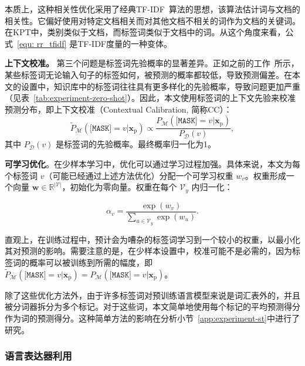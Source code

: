 本质上，这种相关性优化采用了经典TF-IDF~\cite{jones1972statistical}算法的思想，该算法估计词与文档的相关性。它偏好使用对特定文档相关而对其他文档不相关的词作为文档的关键词。在KPT中，类别类似于文档，而标签词类似于文档中的词。从这个角度来看，公式~\eqref{equ: rr_tfidf} 是TF-IDF度量的一种变体。 


\textbf{上下文校准。}\quad
\label{sec: refine-CC}
第三个问题是标签词先验概率的显著差异。正如之前的工作~\cite{pmlr-v139-zhao21c, holtzman2021surface}所示，某些标签词无论输入句子的标签如何，被预测的概率都较低，导致预测偏差。在本文的设置中，知识库中的标签词往往具有更多样化的先验概率，导致问题更加严重（见表~\ref{tab:experiment-zero-shot}）。因此，本文使用标签词的上下文先验来校准预测分布，即上下文校准（Contextual Calibration, 简称CC）：
\begin{equation}
    \tilde{P}_{\mathcal{M}}(\!\texttt{[MASK]}\!\!\!=\!v|\mathbf{x}_{\text{p}}) \!\propto\! \frac{P_{\mathcal{M}}(\!\texttt{[MASK]}\!\!\!=\!v|\mathbf{x}_{\text{p}})}{P_{\mathcal{D}}(v)},
\end{equation}
其中 $P_{\mathcal{D}}(v)$ 是标签词的先验概率。最终概率归一化为1。

\textbf{可学习优化}。在少样本学习中，优化可以通过学习过程加强。具体来说，本文为每个标签词 $v$（可能已经通过上述方法优化）分配一个可学习权重 $w_v$。权重形成一个向量 $\mathbf{w}\in \mathbb{R}^{|\mathcal{V}|}$，初始化为零向量。权重在每个 $\mathcal{V}_y$ 内归一化：

\begin{equation}
    \alpha_v = \frac{\operatorname{exp}(w_v)}{\sum_{u\in \mathcal{V}_y} \operatorname{exp}(w_u)}.
\end{equation}

直观上，在训练过程中，预计会为嘈杂的标签词学习到一个较小的权重，以最小化其对预测的影响。需要注意的是，在少样本设置中，校准可能不是必需的，因为标签词的概率可以被训练到所需的幅度，即 $\tilde{P}_{\mathcal{M}}(\texttt{[MASK]}\!\!\!=\!v|\mathbf{x}_{\text{p}}) ={P_{\mathcal{M}}(\texttt{[MASK]}\!\!\!=\!v|\mathbf{x}_{\text{p}})}$。

除了这些优化方法外，由于许多标签词对预训练语言模型来说是词汇表外的，并且被分词器拆分为多个标记。对于这些词，本文简单地使用每个标记的平均预测得分作为词的预测得分。这种简单方法的影响在分析小节~\ref{app:experiment-st}中进行了研究。

\subsubsection{语言表达器利用}
\label{sec:use}

